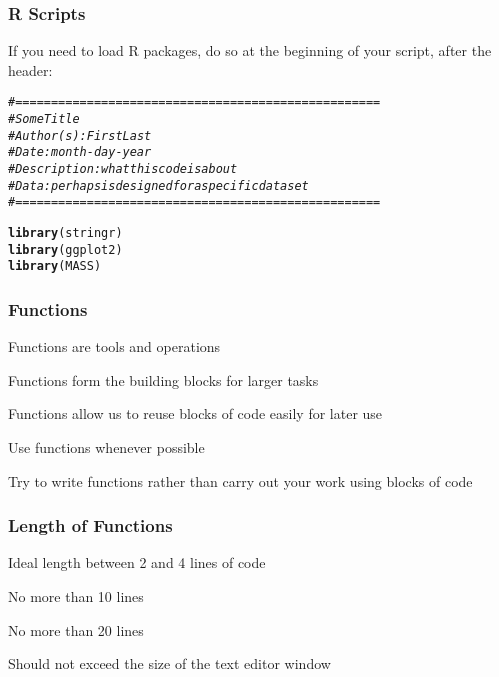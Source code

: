 \documentclass[12pt]{beamer}\usepackage[]{graphicx}\usepackage[]{color}
\makeatletter
\newcommand{\hlcom}[1]{\textcolor[rgb]{0.678,0.584,0.686}{\textit{#1}}}%
\newcommand{\hlstd}[1]{\textcolor[rgb]{0.345,0.345,0.345}{#1}}%
\newcommand{\hlkwd}[1]{\textcolor[rgb]{0.737,0.353,0.396}{\textbf{#1}}}%
\newenvironment{kframe}{%
 \def\at@end@of@kframe{}%
 \ifinner\ifhmode%
  \def\at@end@of@kframe{\end{minipage}}%
  \begin{minipage}{\columnwidth}%
 \fi\fi%
 \def\FrameCommand##1{\hskip\@totalleftmargin \hskip-\fboxsep
 \colorbox{shadecolor}{##1}\hskip-\fboxsep
     \hskip-\linewidth \hskip-\@totalleftmargin \hskip\columnwidth}%
 \MakeFramed {\advance\hsize-\width
   \@totalleftmargin\z@ \linewidth\hsize
   \@setminipage}}%
 {\par\unskip\endMakeFramed%
 \at@end@of@kframe}
\newenvironment{knitrout}{}{} %
\makeatother
\begin{document}
\begin{frame}[fragile]
\frametitle{R Scripts}

If you need to load R packages, do so at the beginning of your script, after the header:
\begin{knitrout}\footnotesize
{}\color{fgcolor}\begin{kframe}
\begin{alltt}
\hlcom{# ===================================================}
\hlcom{# Some Title}
\hlcom{# Author(s): First Last}
\hlcom{# Date: month-day-year}
\hlcom{# Description: what this code is about}
\hlcom{# Data: perhaps is designed for a specific data set}
\hlcom{# ===================================================}

\hlkwd{library}\hlstd{(stringr)}
\hlkwd{library}\hlstd{(ggplot2)}
\hlkwd{library}\hlstd{(MASS)}
\end{alltt}
\end{kframe}
\end{knitrout}

\end{frame}


\begin{frame}
\begin{center}
\Huge{}
\end{center}
\end{frame}


\begin{frame}
\frametitle{Functions}

\bi
 \item Functions are tools and operations
 \item Functions form the building blocks for larger tasks
 \item Functions allow us to reuse blocks of code easily for later use
 \item Use functions whenever possible
 \item Try to write functions rather than carry out your 
 work using blocks of code
\ei

\end{frame}


\begin{frame}
\frametitle{Length of Functions}

\bbi
 \item Ideal length between 2 and 4 lines of code
 \item No more than 10 lines
 \item No more than 20 lines
 \item Should not exceed the size of the text editor window
\ei
\eb

\end{frame}
\end{document}
